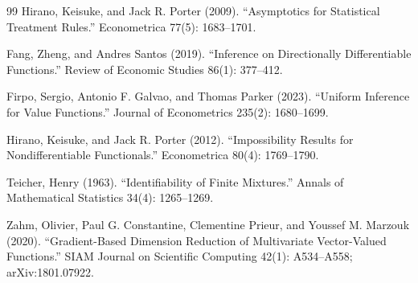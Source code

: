 \documentclass{article}
\begin{document}
\begin{thebibliography}{99}
   Hirano, Keisuke, and Jack R. Porter (2009). ``Asymptotics for Statistical Treatment Rules.'' Econometrica 77(5): 1683--1701.

   Fang, Zheng, and Andres Santos (2019). ``Inference on Directionally Differentiable Functions.'' Review of Economic Studies 86(1): 377--412.

   Firpo, Sergio, Antonio F. Galvao, and Thomas Parker (2023). ``Uniform Inference for Value Functions.'' Journal of Econometrics 235(2): 1680--1699.

   Hirano, Keisuke, and Jack R. Porter (2012). ``Impossibility Results for Nondifferentiable Functionals.'' Econometrica 80(4): 1769--1790.

   Teicher, Henry (1963). ``Identifiability of Finite Mixtures.'' Annals of Mathematical Statistics 34(4): 1265--1269.

   Zahm, Olivier, Paul G. Constantine, Clementine Prieur, and Youssef M. Marzouk (2020). ``Gradient-Based Dimension Reduction of Multivariate Vector-Valued Functions.'' SIAM Journal on Scientific Computing 42(1): A534--A558; arXiv:1801.07922.

\end{thebibliography}
\end{document}
